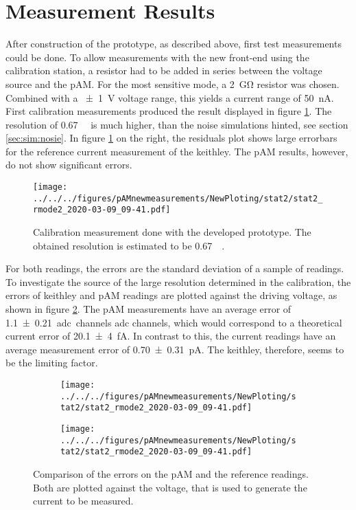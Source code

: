 \section{Measurement Results}
\label{sec:results}
After construction of the prototype, as described above, first test measurements could be done. To allow measurements with the new front-end using the calibration station, a resistor had to be added in series between the voltage source and the \ac{pAM}. For the most sensitive mode, a \SI{2}{\giga\ohm} resistor was chosen. Combined with a \SI{\pm1}{\volt} voltage range, this yields a current range of \SI{50}{\nano\ampere}.
First calibration measurements produced the result displayed in figure \ref{fig:meas:1}. The resolution of \SI{0.67}{\pico\amp} is much higher, than the noise simulations hinted, see section \ref{sec:sim:nosie}. In figure \ref{fig:meas:1} on the right, the residuals plot shows large errorbars for the reference current measurement of the \ac{keithley}. The \ac{pAM} results, however, do not show significant errors.
\begin{figure}
	\centering
	\texttt{[image: ../../../figures/pAMnewmeasurements/NewPloting/stat2/stat2\_rmode2\_2020-03-09\_09-41.pdf]}
	\caption{Calibration measurement done with the developed prototype. The obtained resolution is estimated to be \SI{0.67}{\pico\amp}.}
	\label{fig:meas:1}
\end{figure}
For both readings, the errors are the standard deviation of a sample of readings. To investigate the source of the large resolution determined in the calibration, the errors of \ac{keithley} and \ac{pAM} readings are plotted against the driving voltage, as shown in figure \ref{fig:meas:1:error}. The \ac{pAM} measurements have an average error of \SI{1.1\pm0.21}{\ac{adc} channels} \ac{adc} channels, which would correspond to a theoretical current error of \SI{20.1\pm4}{\femto\ampere}. In contrast to this, the current readings have an average measurement error of \SI{0.70\pm0.31}{\pico\ampere}. The \ac{keithley}, therefore, seems to be the limiting factor.
\begin{figure}
	\centering
	\begin{subfigure}[t]{\textwidth}
		\texttt{[image: ../../../figures/pAMnewmeasurements/NewPloting/stat2/stat2\_rmode2\_2020-03-09\_09-41.pdf]}
	\end{subfigure}
	\begin{subfigure}[t]{\textwidth}
		\texttt{[image: ../../../figures/pAMnewmeasurements/NewPloting/stat2/stat2\_rmode2\_2020-03-09\_09-41.pdf]}
	\end{subfigure}
	\caption{Comparison of the errors on the \ac{pAM} and the reference readings. Both are plotted against the voltage, that is used to generate the current to be measured.}
	\label{fig:meas:1:error}
\end{figure}

